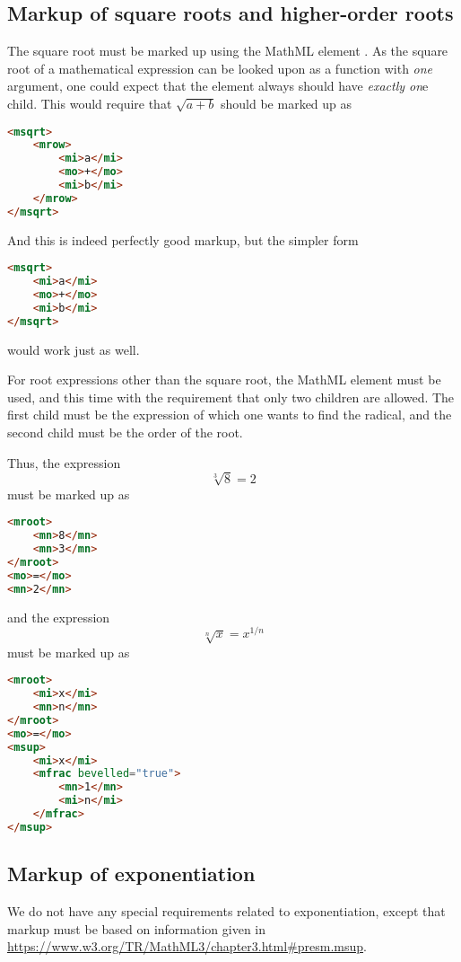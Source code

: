 \documentclass[english,a4paper,11pt]{article}
\begin{document}
\subsection{Markup of square roots and higher-order roots}
The square root must be marked up using the MathML element . As the square root of a mathematical expression can be looked upon as a function with \emph{one} argument, one could expect that the  element always should have \emph{exactly on}e child.
This would require that $\sqrt{a + b}$ should be marked up as
\begin{lstlisting}[language=HTML]
<msqrt>
	<mrow>
		<mi>a</mi>
		<mo>+</mo>
		<mi>b</mi>
	</mrow>
</msqrt>
\end{lstlisting}
And this is indeed perfectly good markup, but the simpler form
\begin{lstlisting}[language=HTML]
<msqrt>
	<mi>a</mi>
	<mo>+</mo>
	<mi>b</mi>
</msqrt>
\end{lstlisting}
would work just as well.

\bigskip For root expressions other than the square root, the MathML element  must be used, and this time with the requirement that only two children are allowed. The first child must be the expression of which one wants to find the radical, and the second child must be the order of the root.

Thus, the expression \begin{equation}\sqrt[3]{8} =2\end{equation}
must be marked up as
\begin{lstlisting}[language=HTML]
<mroot>
	<mn>8</mn>
	<mn>3</mn>
</mroot>
<mo>=</mo>
<mn>2</mn>
\end{lstlisting}
and the expression \begin{equation}\sqrt[n]{x}=x^{1/n} \end{equation}
must be marked up as
\begin{lstlisting}[language=HTML]
<mroot>
	<mi>x</mi>
	<mn>n</mn>
</mroot>
<mo>=</mo>
<msup>
	<mi>x</mi>
	<mfrac bevelled="true">
		<mn>1</mn>
		<mi>n</mi>
	</mfrac>
</msup>
\end{lstlisting}

\subsection{Markup of exponentiation}
We do not have any special requirements related to exponentiation, except that markup must be based on information given in \url{https://www.w3.org/TR/MathML3/chapter3.html#presm.msup}.
\end{document}

